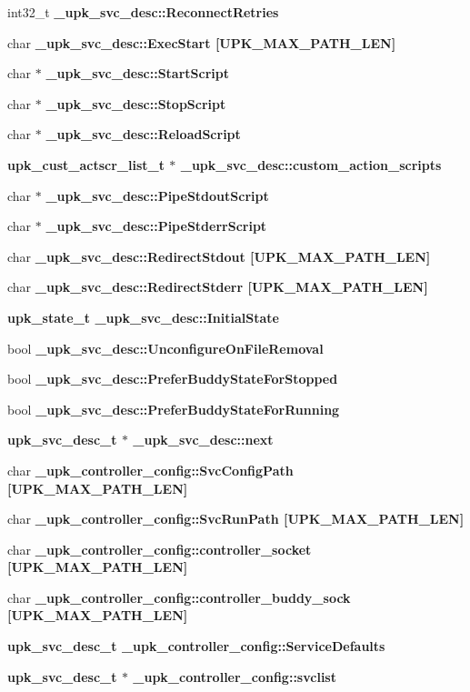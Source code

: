 \begin{CompactItemize}
\item 
int32\_\-t \bf{\_\-upk\_\-svc\_\-desc::Reconnect\-Retries}
\item 
char \bf{\_\-upk\_\-svc\_\-desc::Exec\-Start} [UPK\_\-MAX\_\-PATH\_\-LEN]
\item 
char $\ast$ \bf{\_\-upk\_\-svc\_\-desc::Start\-Script}
\item 
char $\ast$ \bf{\_\-upk\_\-svc\_\-desc::Stop\-Script}
\item 
char $\ast$ \bf{\_\-upk\_\-svc\_\-desc::Reload\-Script}
\item 
\bf{upk\_\-cust\_\-actscr\_\-list\_\-t} $\ast$ \bf{\_\-upk\_\-svc\_\-desc::custom\_\-action\_\-scripts}
\item 
char $\ast$ \bf{\_\-upk\_\-svc\_\-desc::Pipe\-Stdout\-Script}
\item 
char $\ast$ \bf{\_\-upk\_\-svc\_\-desc::Pipe\-Stderr\-Script}
\item 
char \bf{\_\-upk\_\-svc\_\-desc::Redirect\-Stdout} [UPK\_\-MAX\_\-PATH\_\-LEN]
\item 
char \bf{\_\-upk\_\-svc\_\-desc::Redirect\-Stderr} [UPK\_\-MAX\_\-PATH\_\-LEN]
\item 
\bf{upk\_\-state\_\-t} \bf{\_\-upk\_\-svc\_\-desc::Initial\-State}
\item 
bool \bf{\_\-upk\_\-svc\_\-desc::Unconfigure\-On\-File\-Removal}
\item 
bool \bf{\_\-upk\_\-svc\_\-desc::Prefer\-Buddy\-State\-For\-Stopped}
\item 
bool \bf{\_\-upk\_\-svc\_\-desc::Prefer\-Buddy\-State\-For\-Running}
\item 
\bf{upk\_\-svc\_\-desc\_\-t} $\ast$ \bf{\_\-upk\_\-svc\_\-desc::next}
\item 
char \bf{\_\-upk\_\-controller\_\-config::Svc\-Config\-Path} [UPK\_\-MAX\_\-PATH\_\-LEN]
\item 
char \bf{\_\-upk\_\-controller\_\-config::Svc\-Run\-Path} [UPK\_\-MAX\_\-PATH\_\-LEN]
\item 
char \bf{\_\-upk\_\-controller\_\-config::controller\_\-socket} [UPK\_\-MAX\_\-PATH\_\-LEN]
\item 
char \bf{\_\-upk\_\-controller\_\-config::controller\_\-buddy\_\-sock} [UPK\_\-MAX\_\-PATH\_\-LEN]
\item 
\bf{upk\_\-svc\_\-desc\_\-t} \bf{\_\-upk\_\-controller\_\-config::Service\-Defaults}
\item 
\bf{upk\_\-svc\_\-desc\_\-t} $\ast$ \bf{\_\-upk\_\-controller\_\-config::svclist}
\end{CompactItemize}



